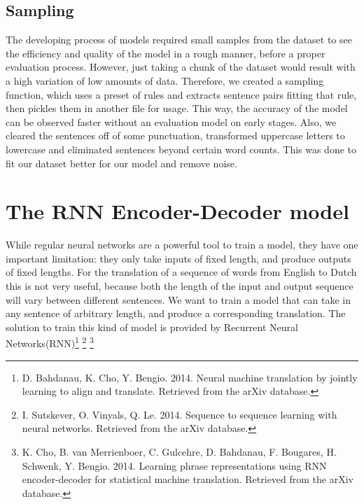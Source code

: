 \documentclass[11pt]{article}
\begin{document}
\subsection{Sampling}
The developing process of models required small samples from the dataset to see the efficiency and quality of the model in a rough manner, before a proper evaluation process. However, just taking a chunk of the dataset would result with a high variation of low amounts of data. Therefore, we created a sampling function, which uses a preset of rules and extracts sentence pairs fitting that rule, then pickles them in another file for usage. This way, the accuracy of the model can be observed faster without an evaluation model on early stages. Also, we cleared the sentences off of some punctuation, transformed uppercase letters to lowercase and eliminated sentences beyond certain word counts. This was done to fit our dataset better for our model and remove noise.

\section{The RNN Encoder-Decoder model}
While regular neural networks are a powerful tool to train a model, they have one important limitation: they only take inputs of fixed length, and produce outputs of fixed lengths. For the translation of a sequence of words from English to Dutch this is not very useful, because both the length of the input and output sequence will vary between different sentences. We want to train a model that can take in any sentence of arbitrary length, and produce a corresponding translation. The solution to train this kind of model is provided by Recurrent Neural Networks(RNN)\footnote[3]{D. Bahdanau, K. Cho, Y. Bengio. 2014. Neural machine translation by jointly learning to align and translate. Retrieved from the arXiv database.} \footnote[4]{ I. Sutskever, O. Vinyals, Q. Le. 2014. Sequence to sequence learning with neural networks. Retrieved from the arXiv database.} \footnote[5]{K. Cho, B. van Merrienboer, C. Gulcehre, D. Bahdanau, F. Bougares, H. Schwenk, Y. Bengio. 2014. Learning phrase representations using RNN encoder-decoder for statistical machine translation. Retrieved from the arXiv database.}
\end{document}
